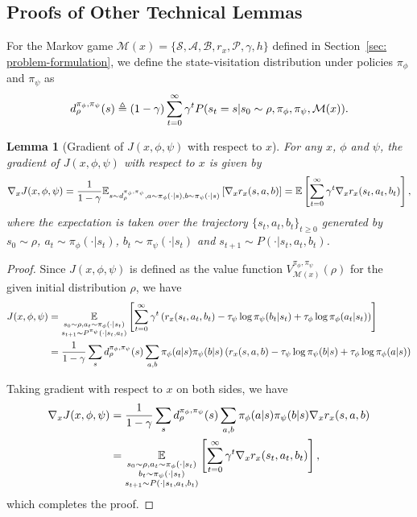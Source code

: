 \documentclass{article}
\theoremstyle{plain}
\newtheorem{lemma}{Lemma}
\theoremstyle{definition}
\theoremstyle{remark}
\def\b1{\mathbf 1}
\def\E{\mathbb E}
\def\cA{\mathcal A}
\def\cB{\mathcal B}
\def\cM{\mathcal M}
\def\cP{\mathcal P}
\def\cS{\mathcal S}
\def\bydef{\triangleq}
\def\b1{\mathbbm{1}}
\begin{document}
\subsection{Proofs of Other Technical Lemmas}
For the Markov game $\cM(x) = \{\cS,\cA,\cB,r_x,\cP,\gamma, h\}$ defined in Section~\ref{sec: problem-formulation}, 
we define the state-visitation distribution under policies $\pi_\phi$ and $\pi_\psi$ as
\begin{align}
    d^{\pi_\phi,\pi_\psi}_\rho(s) \bydef (1-\gamma) \sum_{t=0}^{\infty} \gamma^t P(s_t = s | s_0 \sim \rho, \pi_\phi, \pi_\psi, \cM(x)).\notag
\end{align}
\begin{lemma}[Gradient of $J(x,\phi,\psi)$ with respect to $x$]
    \label{lemma: gradient-J-wrt-x}
    For any $x$, $\phi$ and $\psi$, the gradient of $J(x,\phi,\psi)$ with respect to $x$ is given by
    \begin{align}
        \nabla_x J(x,\phi,\psi) = \frac{1}{1-\gamma} \E_{s \sim d^{\pi_\phi,\pi_\psi}_\rho, a \sim \pi_\phi(\cdot|s), b \sim \pi_\psi(\cdot|s)} \left[ \nabla_x r_x(s,a,b) \right] = \E \left[\sum_{t=0}^{\infty} \gamma^t \nabla_x r_x(s_t,a_t,b_t) \right],\notag
    \end{align}
    where the expectation is taken over the trajectory $\{s_t,a_t,b_t\}_{t \ge 0}$ generated by $s_0 \sim \rho$, $a_t \sim \pi_\phi(\cdot|s_t)$, $b_t \sim \pi_\psi(\cdot|s_t)$ and $s_{t+1} \sim P(\cdot|s_t,a_t,b_t)$.
\end{lemma}
\begin{proof}
    Since $J(x,\phi,\psi)$ is defined as the value function $V^{\pi_\phi,\pi_\psi}_{\cM(x)}(\rho)$ for the given initial distribution $\rho$, we have
    \begin{align}
        J(x,\phi,\psi) &  = \underset{\substack{s_0 \sim \rho, a_t \sim \pi_\phi(\cdot|s_t) \\s_{t+1} \sim P^{\pi_\psi}(\cdot|s_t,a_t)}}{\E} \left[\sum_{t=0}^{\infty} \gamma^t \left( r_x(s_t,a_t,b_t) - \tau_\psi \log \pi_\psi(b_t|s_t) + \tau_\phi \log \pi_\phi(a_t|s_t) \right)\right] \notag\\
        & = \frac{1}{1-\gamma}  \sum_{s} d^{\pi_\phi,\pi_\psi}_\rho(s) \sum_{a,b} \pi_\phi(a|s) \pi_\psi(b|s) \left( r_x(s,a,b) - \tau_\psi \log \pi_\psi(b|s) + \tau_\phi \log \pi_\phi(a|s) \right)\notag
    \end{align}

    Taking gradient with respect to $x$ on both sides, we have
    \begin{align}
        \nabla_x J(x,\phi,\psi) & = \frac{1}{1-\gamma} \sum_{s} d^{\pi_\phi,\pi_\psi}_\rho(s) \sum_{a,b} \pi_\phi(a|s) \pi_\psi(b|s) \nabla_x r_x(s,a,b) \notag\\
        & = \underset{\substack{s_0 \sim \rho, a_t \sim \pi_\phi(\cdot|s_t) \\b_t \sim \pi_\psi(\cdot|s_t) \\s_{t+1} \sim P(\cdot|s_t,a_t,b_t)}}{\E} \left[\sum_{t=0}^{\infty} \gamma^t \nabla_x r_x(s_t,a_t,b_t) \right] ,
    \end{align}
    which completes the proof.
\end{proof}
\end{document}
